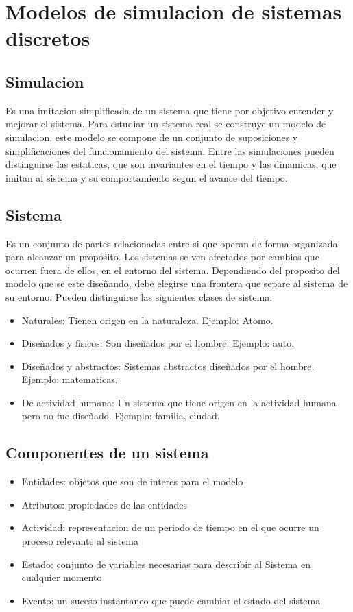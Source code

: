 \documentclass[a4paper]{article}
\begin{document}
\section{Modelos de simulacion de sistemas discretos}
\subsection{Simulacion}
Es una imitacion simplificada de un sistema que tiene por objetivo entender
y mejorar el sistema. 
Para estudiar un sistema real se construye un modelo de simulacion, este modelo 
se compone de un conjunto de suposiciones y simplificaciones del funcionamiento 
del sistema.
Entre las simulaciones pueden distinguirse
las estaticas, que son invariantes en el tiempo y las dinamicas, que imitan
al sistema y su comportamiento segun el avance del tiempo.

\subsection{Sistema} %
Es un conjunto de partes relacionadas entre si que operan de forma 
organizada para alcanzar un proposito.
Los sistemas se ven afectados por cambios que ocurren fuera de ellos,
en el entorno del sistema. Dependiendo del proposito del modelo que 
se este diseñando, debe elegirse una frontera que separe al sistema de
su entorno.
Pueden distinguirse las siguientes clases de sistema:
\begin{itemize}
    \item Naturales: Tienen origen en la naturaleza. Ejemplo: Atomo.
    \item Diseñados y fisicos: Son diseñados por el hombre. Ejemplo: auto.
    \item Diseñados y abstractos: Sistemas abstractos diseñados por el
        hombre. Ejemplo: matematicas.
    \item De actividad humana: Un sistema que tiene origen en la actividad
        humana pero no fue diseñado. Ejemplo: familia, ciudad.
\end{itemize}

\subsection*{Componentes de un sistema}
\begin{itemize}
    \item Entidades: objetos que son de interes para el modelo
    \item Atributos: propiedades de las entidades
    \item Actividad: representacion de un periodo de tiempo en el que ocurre un
    proceso relevante al sistema
    \item Estado: conjunto de variables necesarias para describir al Sistema
    en cualquier momento
    \item Evento: un suceso instantaneo que puede cambiar el estado del sistema
\end{itemize}
\end{document}
